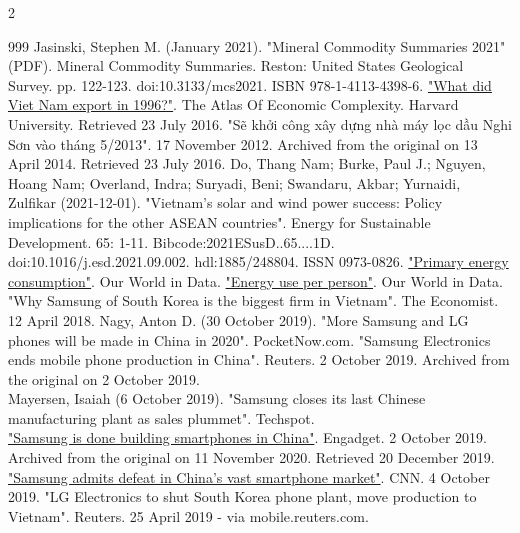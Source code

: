 \documentclass[openany]{book}
\begin{document}
\begin{multicols}{2}
\begin{thebibliography}{999}
 Jasinski, Stephen M. (January 2021). "Mineral Commodity Summaries 2021" (PDF). Mineral Commodity Summaries. Reston: United States Geological Survey. pp. 122-123. doi:10.3133/mcs2021. ISBN 978-1-4113-4398-6.
 \href{http://atlas.cid.harvard.edu/explore/tree_map/export/vnm/all/show/1996/?prod_class=hs4&details_treemap=2&disable_widgets=false&disable_search=false&node_size=none&queryActivated=true&highlight=&yaxis=complexity}{"What did Viet Nam export in 1996?"}. The Atlas Of Economic Complexity. Harvard University. Retrieved 23 July 2016.
 "Sẽ khởi công xây dựng nhà máy lọc dầu Nghi Sơn vào tháng 5/2013". 17 November 2012. Archived from the original on 13 April 2014. Retrieved 23 July 2016.
 Do, Thang Nam; Burke, Paul J.; Nguyen, Hoang Nam; Overland, Indra; Suryadi, Beni; Swandaru, Akbar; Yurnaidi, Zulfikar (2021-12-01). "Vietnam's solar and wind power success: Policy implications for the other ASEAN countries". Energy for Sustainable Development. 65: 1-11. Bibcode:2021ESusD..65....1D. doi:10.1016/j.esd.2021.09.002. hdl:1885/248804. ISSN 0973-0826.
 \href{https://ourworldindata.org/grapher/primary-energy-cons?tab=chart&country=~GHA}{"Primary energy consumption"}. Our World in Data.
 \href{https://ourworldindata.org/grapher/per-capita-energy-use?showSelectionOnlyInTable=1&country=~KEN}{"Energy use per person"}. Our World in Data.
 "Why Samsung of South Korea is the biggest firm in Vietnam". The Economist. 12 April 2018.
 Nagy, Anton D. (30 October 2019). "More Samsung and LG phones will be made in China in 2020". PocketNow.com.
 "Samsung Electronics ends mobile phone production in China". Reuters. 2 October 2019. Archived from the original on 2 October 2019.
\\Mayersen, Isaiah (6 October 2019). "Samsung closes its last Chinese manufacturing plant as sales plummet". Techspot.
\\\href{https://web.archive.org/web/20201111225350/https://www.engadget.com/amp/2019-10-02-samsung-stops-making-phones-in-china.html}{"Samsung is done building smartphones in China"}. Engadget. 2 October 2019. Archived from the original on 11 November 2020. Retrieved 20 December 2019.
\\\href{https://www.cnn.com/2019/10/04/tech/samsung-china-smartphone-production/index.html}{"Samsung admits defeat in China's vast smartphone market"}. CNN. 4 October 2019.
 "LG Electronics to shut South Korea phone plant, move production to Vietnam". Reuters. 25 April 2019 - via mobile.reuters.com.

\end{thebibliography}
\end{multicols}
\end{document}
